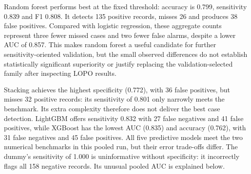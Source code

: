 Random forest performs best at the fixed threshold: accuracy is 0.799,
sensitivity 0.839 and F1 0.808. It detects 135 positive records, misses 26
and produces 38 false positives. Compared with logistic regression, these
aggregate counts represent three fewer missed cases and two fewer false
alarms, despite a lower AUC of 0.857. This makes random forest a useful
candidate for further sensitivity-oriented validation, but the small observed
differences do not establish statistically significant superiority or justify
replacing the validation-selected family after inspecting LOPO results.

Stacking achieves the highest specificity (0.772), with 36 false positives,
but misses 32 positive records: its sensitivity of 0.801 only narrowly meets
the benchmark. Its extra complexity therefore does not deliver the best
case detection. LightGBM offers sensitivity 0.832 with 27 false negatives
and 41 false positives, while XGBoost has the lowest AUC (0.835) and
accuracy (0.762), with 31 false negatives and 45 false positives. All five
predictive models meet the two numerical benchmarks in this pooled run,
but their error trade-offs differ. The dummy's sensitivity of 1.000 is
uninformative without specificity: it incorrectly flags all 158 negative
records. Its unusual pooled AUC is explained below.

